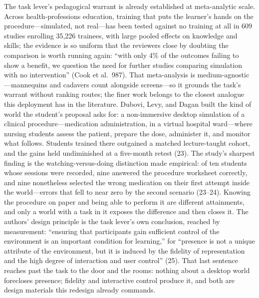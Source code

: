 The task lever's pedagogical warrant is already established at
meta-analytic scale. Across health-professions education, training
that puts the learner's hands on the procedure---simulated, not
real---has been tested against no training at all in 609 studies
enrolling 35,226 trainees, with large pooled effects on knowledge and
skills; the evidence is so uniform that the reviewers close by
doubting the comparison is worth running again: ``with only 4\% of the
outcomes failing to show a benefit, we question the need for further
studies comparing simulation with no intervention'' (Cook et al.\
987). That meta-analysis is medium-agnostic---mannequins and cadavers
count alongside screens---so it grounds the task's warrant without
ranking routes; the finer work belongs to the closest analogue this
deployment has in the literature. Dubovi, Levy, and Dagan built the
kind of world the student's proposal asks for: a non-immersive desktop
simulation of a clinical procedure---medication administration, in a
virtual hospital ward---where nursing students assess the patient,
prepare the dose, administer it, and monitor what follows. Students
trained there outgained a matched lecture-taught cohort, and the gains
held undiminished at a five-month retest (23). The study's sharpest
finding is the watching-versus-doing distinction made empirical: of
ten students whose sessions were recorded, nine answered the procedure
worksheet correctly, and nine nonetheless selected the wrong
medication on their first attempt inside the world---errors that fell
to near zero by the second scenario (23--24). Knowing the procedure on
paper and being able to perform it are different attainments, and only
a world with a task in it exposes the difference and then closes it.
The authors' design principle is the task lever's own conclusion,
reached by measurement: ``ensuring that participants gain sufficient
control of the environment is an important condition for learning,''
for ``presence is not a unique attribute of the environment, but it is
induced by the fidelity of representation and the high degree of
interaction and user control'' (25). That last sentence reaches past
the task to the door and the rooms: nothing about a desktop world
forecloses presence; fidelity and interactive control produce it, and
both are design materials this redesign already commands.

